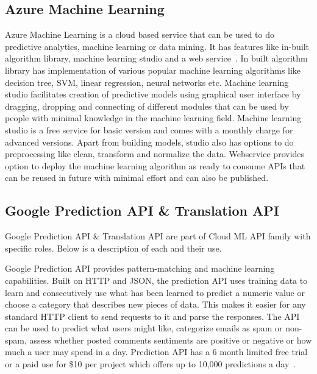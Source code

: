 \subsection{Azure Machine Learning}
    
Azure Machine Learning is a cloud based service that can be used to do
predictive analytics, machine learning or data mining. It has features
like in-built algorithm library, machine learning studio and a web
service~\cite{www-azureMLSite}. In built algorithm library has
implementation of various popular machine learning algorithms like
decision tree, SVM, linear regression, neural networks etc. Machine
learning studio facilitates creation of predictive models using
graphical user interface by dragging, dropping and connecting of
different modules that can be used by people with minimal knowledge in
the machine learning field. Machine learning studio is a free service
for basic version and comes with a monthly charge for advanced
versions. Apart from building models, studio also has options to do
preprocessing like clean, transform and normalize the data. Webservice
provides option to deploy the machine learning algorithm as ready to
consume APIs that can be reused in future with minimal effort and can
also be published.
    
\subsection{Google Prediction API \& Translation API}

    Google Prediction API \& Translation API are part of Cloud ML API
    family with specific roles. Below is a description of each and
    their use.

    Google Prediction API provides pattern-matching and machine
    learning capabilities. Built on HTTP and JSON, the prediction API
    uses training data to learn and consecutively use what has been
    learned to predict a numeric value or choose a category that
    describes new pieces of data. This makes it easier for any
    standard HTTP client to send requests to it and parse the
    responses. The API can be used to predict what users might like,
    categorize emails as spam or non-spam, assess whether posted
    comments sentiments are positive or negative or how much a user
    may spend in a day. Prediction API has a 6 month limited free
    trial or a paid use for \$10 per project which offers up to 10,000
    predictions a day~\cite{www-prediction}.

